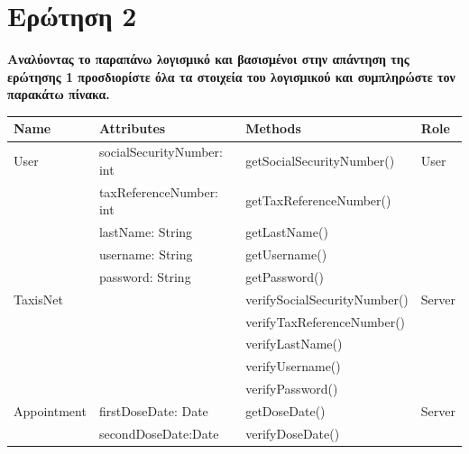 \documentclass[12pt]{turabian-researchpaper}
\begin{document}
\section{Ερώτηση 2}
\textbf{Αναλύοντας το παραπάνω λογισμικό και βασισμένοι στην απάντηση της ερώτησης 1 προσδιορίστε όλα τα στοιχεία του λογισμικού και συμπληρώστε τον παρακάτω πίνακα.}

\begin{center}
    \begin{table}[]
        \centering
        \begin{tabular}{|l|l|l|l|}
            \hline
            \textbf{Name} & \textbf{Attributes}       & \textbf{Methods}             & \textbf{Role} \\ \hline
            User          & socialSecurityNumber: int & getSocialSecurityNumber()    & User          \\
                          & taxReferenceNumber: int   & getTaxReferenceNumber()      &               \\
                          & lastName: String          & getLastName()                &               \\ \hline
                          & username: String          & getUsername()                &               \\ \hline
                          & password: String          & getPassword()                &               \\ \hline
            TaxisNet      &                           & verifySocialSecurityNumber() & Server        \\
                          &                           & verifyTaxReferenceNumber()   &               \\
                          &                           & verifyLastName()             &               \\
                          &                           & verifyUsername()             &               \\
                          &                           & verifyPassword()             &               \\ \hline
            Appointment   & firstDoseDate: Date       & getDoseDate()                & Server        \\
                          & secondDoseDate:Date       & verifyDoseDate()             &               \\ \hline
        \end{tabular}
    \end{table}

\end{center}
\end{document}
